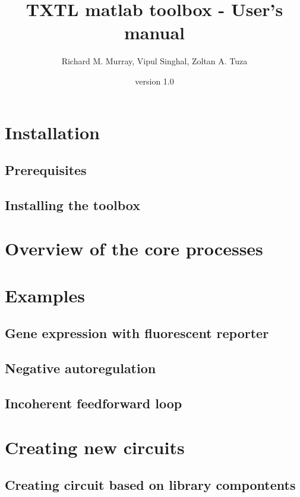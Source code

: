 \documentclass[english]{report}
\begin{document}
\title{TXTL matlab toolbox - User's manual}


\date{version 1.0}


\author{Richard M. Murray, Vipul Singhal, Zoltan A. Tuza}

\maketitle

\chapter{Installation}


\section{Prerequisites}


\section{Installing the toolbox}


\chapter{Overview of the core processes}


\chapter{Examples}


\section{Gene expression with fluorescent reporter}


\section{Negative autoregulation}


\section{Incoherent feedforward loop}


\chapter{Creating new circuits}


\section{Creating circuit based on library compontents}
\end{document}
